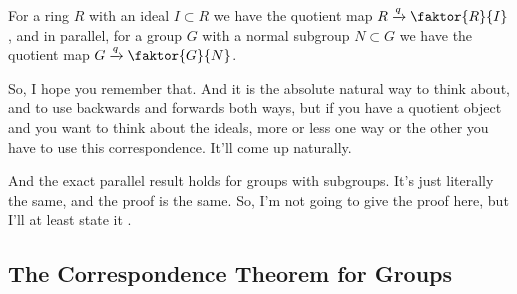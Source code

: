 \begin{content}

For a ring $R$ with an ideal $I \subset R$ we have the quotient map $R \xrightarrow{q} \faktor{R}{I}$, and in parallel, for a group $G$ with a normal subgroup $N \subset G$ we have the quotient map $G \xrightarrow{q} \faktor{G}{N}$.

\end{content}

\begin{speech}[00:16:05 - 00:16:39]
So, I hope you remember that. And it is the absolute natural way to think about, and to use backwards and forwards both ways, but if you have a quotient object and you want to think about the ideals, more or less one way or the other you have to use this correspondence. It'll come up naturally.

And the exact parallel result holds for groups with subgroups. It's just literally the same, and the proof is the same. So, I'm not going to give the proof here, but I'll at least state it .
\end{speech}

\subsection{The Correspondence Theorem for Groups}

